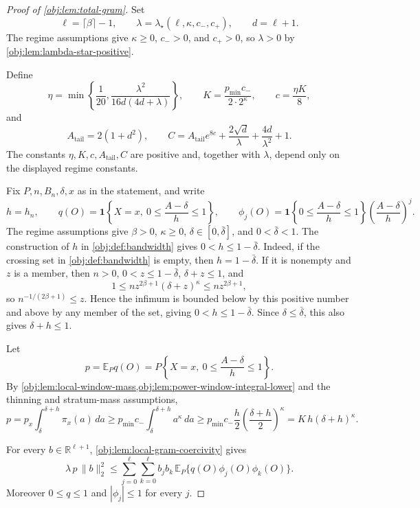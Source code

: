 \begin{proof}[Proof of \cref{obj:lem:total-gram}]
Set
\[
\ell=\lceil\beta\rceil-1,\qquad
\lambda=\lambda_\star(\ell,\kappa,c_-,c_+),\qquad
d=\ell+1 .
\]
The regime assumptions give \(\kappa\ge0\), \(c_->0\), and \(c_+>0\), so \(\lambda>0\) by \cref{obj:lem:lambda-star-positive}. %

Define
\[
\eta=
\min\left\{
\frac1{20},
\frac{\lambda^2}{16d(4d+\lambda)}
\right\},
\qquad
K=\frac{p_{\min}c_-}{2\cdot2^\kappa},
\qquad
c=\frac{\eta K}{8},
\]
and
\[
A_{\mathrm{tail}}=2(1+d^2),\qquad
C=
A_{\mathrm{tail}}e^{8c}+\frac{2\sqrt d}{\lambda}+\frac{4d}{\lambda^2}+1 .
\]
The constants \(\eta,K,c,A_{\mathrm{tail}},C\) are positive and, together with \(\lambda\), depend only on the displayed regime constants. %

Fix \(P,n,B_n,\delta,x\) as in the statement, and write
\[
h=h_n,
\qquad
q(O)=\mathbf 1\left\{X=x,\ 0\le\frac{A-\delta}{h}\le1\right\},
\qquad
\phi_j(O)=
\mathbf 1\left\{0\le\frac{A-\delta}{h}\le1\right\}
\left(\frac{A-\delta}{h}\right)^j .
\]
The regime assumptions give \(\beta>0\), \(\kappa\ge0\), \(\delta\in[0,\bar\delta]\), and \(0<\bar\delta<1\).  The construction of \(h\) in \cref{obj:def:bandwidth} gives \(0<h\le1-\bar\delta\).  Indeed, if the crossing set in \cref{obj:def:bandwidth} is empty, then \(h=1-\bar\delta\).  If it is nonempty and \(z\) is a member, then \(n>0\), \(0<z\le1-\bar\delta\), \(\delta+z\le1\), and
\[
1\le n z^{2\beta+1}(\delta+z)^\kappa\le n z^{2\beta+1},
\]
so \(n^{-1/(2\beta+1)}\le z\).  Hence the infimum is bounded below by this positive number and above by any member of the set, giving \(0<h\le1-\bar\delta\).  Since \(\delta\le\bar\delta\), this also gives \(\delta+h\le1\). %

Let
\[
p=\mathbb E_P q(O)
=
P\left\{X=x,\ 0\le\frac{A-\delta}{h}\le1\right\}.
\]
By \cref{obj:lem:local-window-mass,obj:lem:power-window-integral-lower} and the thinning and stratum-mass assumptions,
\[
p
=
p_x\int_{\delta}^{\delta+h}\pi_x(a)\,da
\ge
p_{\min}c_-\int_{\delta}^{\delta+h}a^\kappa\,da
\ge
p_{\min}c_-\frac h2\left(\frac{\delta+h}{2}\right)^\kappa
=
K\,h(\delta+h)^\kappa .
\]

For every \(b\in\mathbb R^{\ell+1}\), \cref{obj:lem:local-gram-coercivity} gives
\[
\lambda\,p\,\|b\|_2^2
\le
\sum_{j=0}^{\ell}\sum_{k=0}^{\ell}
b_jb_k\,\mathbb E_P\{q(O)\phi_j(O)\phi_k(O)\}.
\]
Moreover \(0\le q\le1\) and \(|\phi_j|\le1\) for every \(j\). %


\end{proof}
